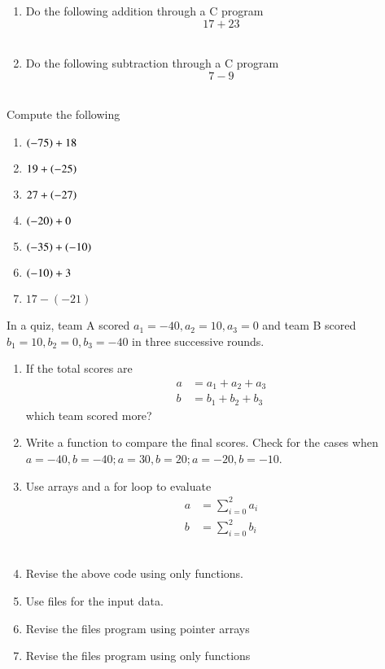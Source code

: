 \begin{enumerate}[label=\thesubsection.\arabic*, ref=\thesubsection.\theenumi]
\item Do the following addition through a C program
	$$17+23$$
	\\
	\solution
	
\item Do the following subtraction through a C program
$$7-9$$
	\\
	\solution
	
\end{enumerate}
Compute the following
\begin{enumerate}[label=\thesubsection.\arabic*, ref=\thesubsection.\theenumi,resume*]
\item $\left(-75\right)+18$
\item $19+\left(-25\right)$
\item $27+\left(-27\right)$
\item $\left(-20\right)+0$
\item $\left(-35\right)+\left(-10\right)$
\item $\left(-10\right)+3$
\item $17-(-21)$
\end{enumerate}
In a quiz, team A scored $a_1 = -40, a_2=10, a_3=0$ and team B scored $b_1=10, b_2=0, b_3=-40$ in three successive rounds.
\begin{enumerate}[label=\thesubsection.\arabic*, ref=\thesubsection.\theenumi,resume*]
\item  If the total scores are 
	\begin{align}
		a &= a_1+a_2+a_3
		\\
		b &= b_1+b_2+b_3
	\end{align}
	which team scored more? 
	\\
	\solution 
	
\item Write a function to compare the final scores.  Check for the cases when $a = -40, b = -40; a = 30, b = 20; a = -20, b = -10$.
	\\
	\solution 
	
\item Use arrays and a for loop to evaluate 
	\begin{align}
		a &= \sum_{i=0}^{2}a_i
		\\
		b &= \sum_{i=0}^{2}b_i
	\end{align}
	\\
	\solution 
	
\item Revise the above code using only functions.
	\\
	\solution 
	
\item Use files for the input data.
	\\
	\solution 
	
\item Revise the files program using pointer arrays
	\\
	\solution 
	
\item Revise the files program using only functions
	\\
	\solution 
	
\end{enumerate}
